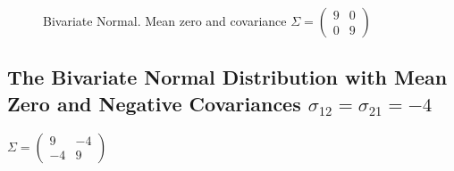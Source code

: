 \documentclass[
  letterpaper,
  DIV=11,
  numbers=noendperiod]{scrreprt}
\begin{document}
\begin{figure}


\caption{\label{fig-bi9000}Bivariate Normal. Mean zero and covariance
\(\Sigma=\begin{pmatrix} 9 & 0 \\ 0 & 9\end{pmatrix}\)}

\end{figure}%

\subsection{\texorpdfstring{The Bivariate Normal Distribution with Mean
Zero and Negative Covariances
\(\sigma_{12} = \sigma_{21} = -4\)}{The Bivariate Normal Distribution with Mean Zero and Negative Covariances \textbackslash sigma\_\{12\} = \textbackslash sigma\_\{21\} = -4}}\label{the-bivariate-normal-distribution-with-mean-zero-and-negative-covariances-sigma_12-sigma_21--4}

\(\Sigma=\begin{pmatrix} 9 & -4 \\ -4 & 9\end{pmatrix}\)
\end{document}
